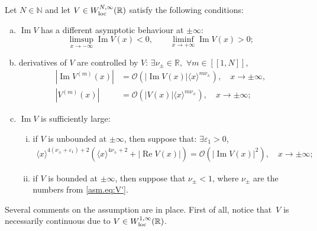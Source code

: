 \begin{Assumption}\label{asm:basic}
Let $N \in {\mathbb{N}}$  and let $V \in W^{N,\infty}_{\rm loc}({\mathbb{R}})$ satisfy the following conditions:
\begin{enumerate}[a)]
\item ${\operatorname{Im}} V$ has a different asymptotic behaviour at $\pm \infty$:
\begin{equation}\label{asm.eq:ImV}
\limsup_{x\to -\infty} {\operatorname{Im}} V(x) <0 , \qquad  \liminf_{x\to +\infty} {\operatorname{Im}} V(x) >0;
\end{equation}
\item derivatives of $V$ are controlled by $V$: $\exists \nu_\pm \in {\mathbb{R}},$  $\forall m \in [[1,N]]$,
\begin{equation}\label{asm.eq:V'}
\begin{aligned}
|{\operatorname{Im}} V^{(m)}(x)| &= {\mathcal{O}} \left(|{\operatorname{Im}} V(x)| \langle x \rangle^{m\nu_\pm} \right), \quad x \to \pm \infty,
\\
|V^{(m)}(x)| &= {\mathcal{O}} \left(|V(x)| \langle x \rangle^{m\nu_\pm} \right), \quad x \to \pm \infty;
\end{aligned}
\end{equation}
\item ${\operatorname{Im}} V$ is sufficiently large:
\label{asm:basic.c}
\begin{enumerate}[i)]
	\item if $V$ is unbounded at $\pm \infty$, then suppose that: $\exists {\varepsilon}_1 > 0$, 
\begin{equation}\label{asm.eq:ReV}
\begin{aligned}
\langle x \rangle^{4(\nu_\pm +{\varepsilon}_1)+2} 
(\langle x \rangle^{4\nu_\pm +2} + |{\operatorname{Re}} V(x)| )  
= {\mathcal{O}}\left(|{\operatorname{Im}} V(x)|^2\right), \quad x \to \pm \infty;
\end{aligned}
\end{equation}
\item if $V$ is bounded at $\pm \infty$, 
then suppose that $\nu_\pm<1$, 
where $\nu_\pm$ are the numbers from \eqref{asm.eq:V'}.
\end{enumerate}
\end{enumerate}
\end{Assumption}

Several comments on the assumption are in place. 
First of all, notice that~$V$ is necessarily continuous
due to $V \in W^{1,\infty}_{\rm loc}({\mathbb{R}})$.

